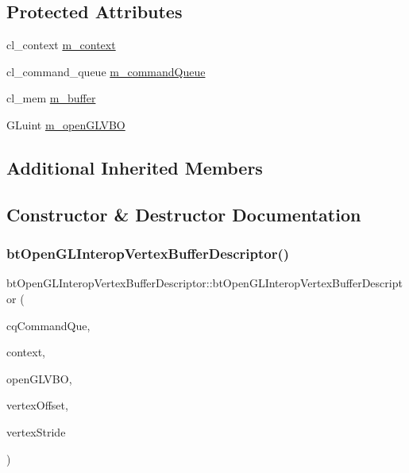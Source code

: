 \subsection*{Protected Attributes}
\begin{DoxyCompactItemize}
\item 
cl\+\_\+context \hyperlink{classbtOpenGLInteropVertexBufferDescriptor_a3c6c5547bbb9d993717db1414f74ab38}{m\+\_\+context}
\item 
cl\+\_\+command\+\_\+queue \hyperlink{classbtOpenGLInteropVertexBufferDescriptor_a710e2e4eb234a107dc10e32528b54cd7}{m\+\_\+command\+Queue}
\item 
cl\+\_\+mem \hyperlink{classbtOpenGLInteropVertexBufferDescriptor_a2a0be0a9f9fa154dcf25b7cd4044b5cb}{m\+\_\+buffer}
\item 
G\+Luint \hyperlink{classbtOpenGLInteropVertexBufferDescriptor_aceb2909c30dc9fb57520211254e5d8e8}{m\+\_\+open\+G\+L\+V\+BO}
\end{DoxyCompactItemize}
\subsection*{Additional Inherited Members}


\subsection{Constructor \& Destructor Documentation}
\mbox{\label{classbtOpenGLInteropVertexBufferDescriptor_aaa1a32a4c4589836a19b8965f8c8a828}} 
\subsubsection{\texorpdfstring{bt\+Open\+G\+L\+Interop\+Vertex\+Buffer\+Descriptor()}{btOpenGLInteropVertexBufferDescriptor()}\hspace{0.1cm}{\footnotesize\ttfamily [1/4]}}
{\footnotesize\ttfamily bt\+Open\+G\+L\+Interop\+Vertex\+Buffer\+Descriptor\+::bt\+Open\+G\+L\+Interop\+Vertex\+Buffer\+Descriptor (\begin{DoxyParamCaption}\item[{cl\+\_\+command\+\_\+queue}]{cq\+Command\+Que,  }\item[{cl\+\_\+context}]{context,  }\item[{G\+Luint}]{open\+G\+L\+V\+BO,  }\item[{int}]{vertex\+Offset,  }\item[{int}]{vertex\+Stride }\end{DoxyParamCaption})\hspace{0.3cm}{\ttfamily [inline]}}

